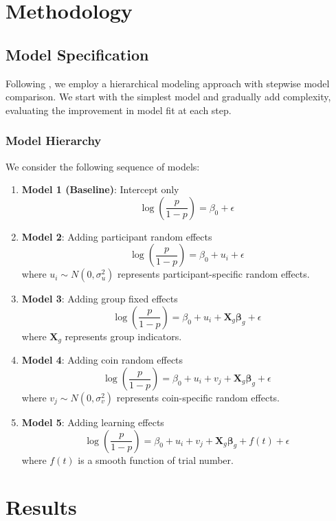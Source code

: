 \documentclass[12pt,a4paper]{article}
\begin{document}
\section{Methodology}
\subsection{Model Specification}
Following \cite{gelman2006data}, we employ a hierarchical modeling approach with stepwise model comparison. We start with the simplest model and gradually add complexity, evaluating the improvement in model fit at each step.

\subsubsection{Model Hierarchy}
We consider the following sequence of models:

\begin{enumerate}
    \item \textbf{Model 1 (Baseline)}: Intercept only
    \[
    \log\left(\frac{p}{1-p}\right) = \beta_0 + \epsilon
    \]
    
    \item \textbf{Model 2}: Adding participant random effects
    \[
    \log\left(\frac{p}{1-p}\right) = \beta_0 + u_i + \epsilon
    \]
    where $u_i \sim N(0, \sigma^2_u)$ represents participant-specific random effects.
    
    \item \textbf{Model 3}: Adding group fixed effects
    \[
    \log\left(\frac{p}{1-p}\right) = \beta_0 + u_i + \mathbf{X}_g\boldsymbol{\beta}_g + \epsilon
    \]
    where $\mathbf{X}_g$ represents group indicators.
    
    \item \textbf{Model 4}: Adding coin random effects
    \[
    \log\left(\frac{p}{1-p}\right) = \beta_0 + u_i + v_j + \mathbf{X}_g\boldsymbol{\beta}_g + \epsilon
    \]
    where $v_j \sim N(0, \sigma^2_v)$ represents coin-specific random effects.
    
    \item \textbf{Model 5}: Adding learning effects
    \[
    \log\left(\frac{p}{1-p}\right) = \beta_0 + u_i + v_j + \mathbf{X}_g\boldsymbol{\beta}_g + f(t) + \epsilon
    \]
    where $f(t)$ is a smooth function of trial number.
\end{enumerate}

\section{Results}
\end{document}
